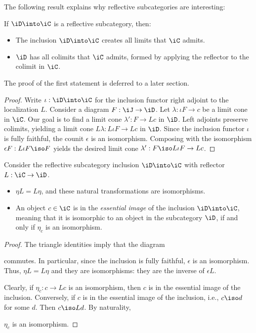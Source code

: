 \documentclass{amsart}
\begin{document}
The following result explains why reflective subcategories are interesting:
\begin{lem}
  If $\iD \into \iC$ is a reflective subcategory, then:
  \begin{itemize}
  \item The inclusion $\iD \into \iC$ creates all limits that $\iC$ admits.
  \item $\iD$ has all colimits that $\iC$ admits, formed by applying the reflector to the colimit in $\iC$.
  \end{itemize}
\end{lem}
The proof of the first statement is deferred to a later section.
\begin{proof}
  Write $\iota : \iD \into \iC$ for the inclusion functor right adjoint to the localization $L$.
  Consider a diagram $F : \iJ \to \iD$.
  Let $\lambda : \iota F \to c$ be a limit cone in $\iC$.
  Our goal is to find a limit cone $\lambda' : F \to Lc$ in $\iD$.
  Left adjoints preserve colimits, yielding a limit cone $L\lambda : L\iota F \to Lc$ in $\iD$.
  Since the inclusion functor $\iota$ is fully faithful, the counit $\epsilon$ is an isomorphism.
  Composing with the isomorphism $\epsilon F : L\iota F \iso F$ yields the desired limit cone $\lambda' : F \iso L\iota F \to Lc$.
\end{proof}

\begin{lem}
  Consider the reflective subcategory inclusion $\iD \into \iC$ with reflector $L : \iC \to \iD$.
  \begin{itemize}
  \item $\eta L = L\eta$, and these natural transformations are isomorphisms.
  \item An object $c \in \iC$ is in the \emph{essential image} of the inclusion $\iD \into \iC$, meaning that it is isomorphic to an object in the subcategory $\iD$, if and only if $\eta_{c}$ is an isomorphism.
  \end{itemize}
\end{lem}
\begin{proof}
  The triangle identities imply that the diagram
  
  commutes.
  In particular, since the inclusion is fully faithful, $\epsilon$ is an isomorphism.
  Thus, $\eta L = L\eta$ and they are isomorphisms: they are the inverse of $\epsilon L$.

  Clearly, if $\eta_{c} : c \to Lc$ is an isomorphism, then $c$ is in the essential image of the inclusion.
  Conversely, if $c$ is in the essential image of the inclusion, i.e., $c \iso d$ for some $d$.
  Then $c \iso L d$.
  By naturality,
  
  $\eta_{c}$ is an isomorphism.
\end{proof}



\end{document}
